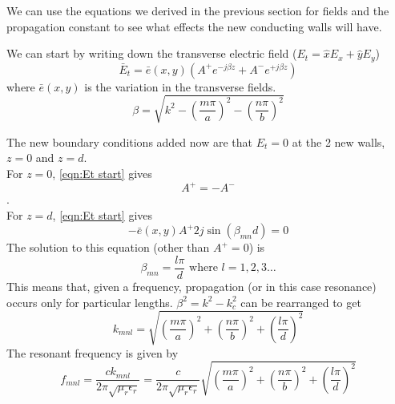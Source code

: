 We can use the equations we derived in the previous section for fields and the propagation constant to see what effects the new conducting walls will have.

We can start by writing down the transverse electric field ($E_t = \hat{x}E_x+\hat{y}E_y$)
\begin{equation}
\bar{E}_t=\bar{e}(x,y)(A^+e^{-j\beta z}+A^-e^{+j\beta z})
\label{eqn:Et start}
\end{equation}
where $\bar{e}(x,y)$ is the variation in the transverse fields.
\begin{equation}
\beta = \sqrt{k^2-\left(\frac{m \pi}{a}\right)^2-\left(\frac{n \pi}{b}\right)^2}
\end{equation}

The new boundary conditions added now are that $E_t=0$ at the 2 new walls, $z=0$ and $z=d$.\\
For $z=0$, \ref{eqn:Et start} gives 
\begin{equation}
A^+=-A^-
\end{equation}.\\
For $z=d$, \ref{eqn:Et start} gives
\begin{equation}
-\bar{e}(x,y)A^+2j\sin(\beta_{mn}d)=0
\end{equation}
The solution to this equation (other than $A^+=0$) is
\begin{equation}
\beta_{mn}=\frac{l\pi}{d} \text{ where } l=1,2,3\ldots
\end{equation}
This means that, given a frequency, propagation (or in this case resonance) occurs only for particular lengths. $\beta^2=k^2-k_c^2$ can be rearranged to get
\begin{equation}
k_{mnl}=\sqrt{\left(\frac{m \pi}{a}\right)^2+\left(\frac{n \pi}{b}\right)^2+\left(\frac{l \pi}{d}\right)^2}
\end{equation}
The resonant frequency is given by
\begin{equation}
f_{mnl}=\frac{ck_{mnl}}{2\pi\sqrt{\mu_r\epsilon_r}}=\frac{c}{2\pi\sqrt{\mu_r\epsilon_r}}\sqrt{\left(\frac{m \pi}{a}\right)^2+\left(\frac{n \pi}{b}\right)^2+\left(\frac{l \pi}{d}\right)^2}
\end{equation}


